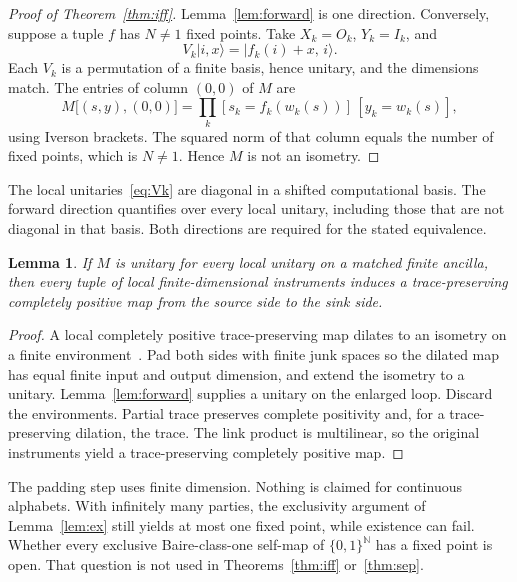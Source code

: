 \documentclass[aps,pra,reprint,amsmath,amssymb,nofootinbib]{revtex4-2}
\newtheorem{lemma}[theorem]{Lemma}
\begin{document}
\begin{proof}[Proof of Theorem~\ref{thm:iff}]
Lemma~\ref{lem:forward} is one direction. Conversely, suppose a tuple \(f\) has \(N\neq 1\) fixed points. Take \(X_k=O_k\), \(Y_k=I_k\), and
\begin{equation}
\label{eq:Vk}
V_k\lvert i,x\rangle=\lvert f_k(i)+x,\,i\rangle.
\end{equation}
Each \(V_k\) is a permutation of a finite basis, hence unitary, and the dimensions match. The entries of column \((0,0)\) of \(M\) are
\begin{equation}
M\bigl[(s,y),(0,0)\bigr]
=\prod_k [s_k=f_k(w_k(s))]\,[y_k=w_k(s)],
\end{equation}
using Iverson brackets. The squared norm of that column equals the number of fixed points, which is \(N\neq 1\). Hence \(M\) is not an isometry.
\end{proof}

The local unitaries~\eqref{eq:Vk} are diagonal in a shifted computational basis. The forward direction quantifies over every local unitary, including those that are not diagonal in that basis. Both directions are required for the stated equivalence.

\begin{lemma}
\label{lem:valid}
If \(M\) is unitary for every local unitary on a matched finite ancilla, then every tuple of local finite-dimensional instruments induces a trace-preserving completely positive map from the source side to the sink side.
\end{lemma}

\begin{proof}
A local completely positive trace-preserving map dilates to an isometry on a finite environment~\cite{stinespring1955}. Pad both sides with finite junk spaces so the dilated map has equal finite input and output dimension, and extend the isometry to a unitary. Lemma~\ref{lem:forward} supplies a unitary on the enlarged loop. Discard the environments. Partial trace preserves complete positivity and, for a trace-preserving dilation, the trace. The link product is multilinear, so the original instruments yield a trace-preserving completely positive map.
\end{proof}

The padding step uses finite dimension. Nothing is claimed for continuous alphabets. With infinitely many parties, the exclusivity argument of Lemma~\ref{lem:ex} still yields at most one fixed point, while existence can fail. Whether every exclusive Baire-class-one self-map of \(\{0,1\}^{\mathbb{N}}\) has a fixed point is open. That question is not used in Theorems~\ref{thm:iff} or~\ref{thm:sep}.
\end{document}
